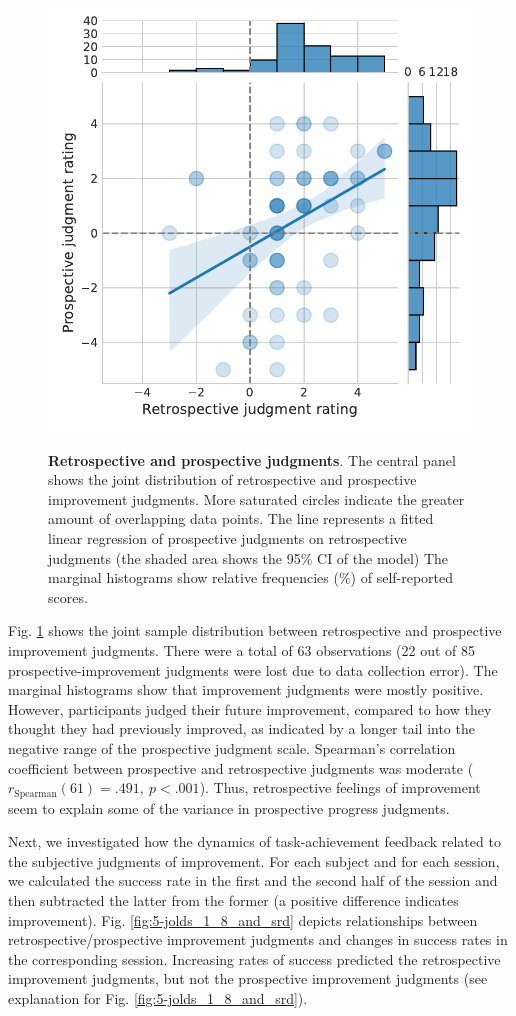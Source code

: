 \begin{figure}[bth]
    \centering
    {\includegraphics[width=.6\linewidth]{Figures/c5/jolds_corr.pdf}}
    \caption[short figure description]{\textbf{Retrospective and prospective judgments}. The central panel shows the joint distribution of retrospective and prospective improvement judgments. More saturated circles indicate the greater amount of overlapping data points. The line represents a fitted linear regression of prospective judgments on retrospective judgments (the shaded area shows the 95\% CI of the model) The marginal histograms show relative frequencies (\%) of self-reported scores.}\label{fig:5-jolds_corr}
\end{figure}

Fig. \ref{fig:5-jolds_corr} shows the joint sample distribution between retrospective and prospective improvement judgments. There were a total of 63 observations (22 out of 85 prospective-improvement judgments were lost due to data collection error). The marginal histograms show that improvement judgments were mostly positive. However, participants judged their future improvement, compared to how they thought they had previously improved, as indicated by a longer tail into the negative range of the prospective judgment scale. Spearman's correlation coefficient between prospective and retrospective judgments was moderate ($r_{\mathrm{Spearman}}(61) = .491,\ p < .001$). Thus, retrospective feelings of improvement seem to explain some of the variance in prospective progress judgments.

Next, we investigated how the dynamics of task-achievement feedback related to the subjective judgments of improvement. For each subject and for each session, we calculated the success rate in the first and the second half of the session and then subtracted the latter from the former (a positive difference indicates improvement). Fig. \ref{fig:5-jolds_1_8_and_srd} depicts relationships between retrospective/prospective improvement judgments and changes in success rates in the corresponding session. Increasing rates of success predicted the retrospective improvement judgments, but not the prospective improvement judgments (see explanation for Fig. \ref{fig:5-jolds_1_8_and_srd}).

